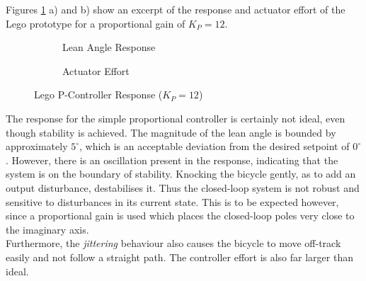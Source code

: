 Figures \ref{fig:LegoPController} a) and b) show an excerpt of the response and actuator effort of the Lego prototype for a proportional gain of $K_P=12$.

\begin{figure}[H]
	\begin{subfigure}{0.5\textwidth}
	\caption{Lean Angle Response}
	\end{subfigure} \hspace{1mm}
	\begin{subfigure}{0.5\textwidth}
	\caption{Actuator Effort}
	\end{subfigure}
	\caption{Lego P-Controller Response ($K_P=12$)}
	\label{fig:LegoPController}
\end{figure}

The response for the simple proportional controller is certainly not ideal, even though stability is achieved.  The magnitude of the lean angle is bounded by approximately $5^{\circ}$, which is an acceptable deviation from the desired setpoint of $0^{\circ}$. However, there is an oscillation present in the response, indicating that the system is on the boundary of stability. Knocking the bicycle gently, as to add an output disturbance, destabilises it. Thus the closed-loop system is not robust and sensitive to disturbances in its current state. This is to be expected however, since a proportional gain is used which places the closed-loop poles very close to the imaginary axis. \\

Furthermore, the \textit{jittering} behaviour also causes the bicycle to move off-track easily and not follow a straight path. The controller effort is also far larger than ideal. \\

